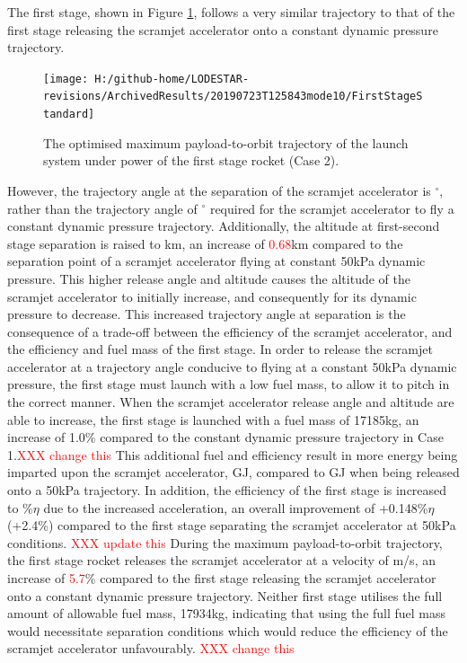 The first stage, shown in Figure \ref{fig:FirstStageStandardNoReturn}, follows a very similar trajectory to that of the first stage releasing the scramjet accelerator onto a constant dynamic pressure trajectory.
\begin{figure}[ht!]%
	\centering
	\texttt{[image: H:/github-home/LODESTAR-revisions/ArchivedResults/20190723T125843mode10/FirstStageStandard]}
	\caption{The optimised maximum payload-to-orbit trajectory of the launch system under power of the first stage rocket (Case 2).}
	\label{fig:FirstStageStandardNoReturn}
\end{figure}
 However, the trajectory angle at the separation of the scramjet accelerator is \secondthirdSeparationgammaqStandardNoReturn$^\circ$, rather than the trajectory angle of \secondthirdSeparationgammaConstqNoReturn$^\circ$ required for the scramjet accelerator to fly a constant dynamic pressure trajectory. Additionally, the altitude at first-second stage separation is raised to \firstsecondSeparationAltStandardNoReturn km, an increase of \textcolor{red}{0.68}km compared to the separation point of a scramjet accelerator flying at constant 50kPa dynamic pressure. This higher release angle and altitude causes the altitude of the scramjet accelerator to initially increase, and consequently for its dynamic pressure to decrease. This increased trajectory angle at separation is the consequence of a trade-off between the efficiency of the scramjet accelerator, and the efficiency and fuel mass of the first stage. 
 In order to release the scramjet accelerator at a trajectory angle conducive to flying at a constant 50kPa dynamic pressure, the first stage must launch with a low fuel mass, to allow it to pitch in the correct manner. When the scramjet accelerator release angle and altitude are able to increase, the first stage is launched with a fuel mass of 17185kg, an increase of 1.0\% compared to the constant dynamic pressure trajectory in Case 1.\textcolor{red}{XXX change this} This additional fuel and efficiency result in more energy being imparted upon the scramjet accelerator, \firstdExergyStandardNoReturn GJ, compared to \firstdExergyConstqNoReturn GJ when being released onto a 50kPa trajectory. 
 In addition, the efficiency of the first stage is increased to \firstExergyEffStandardNoReturn\%$\eta$ due to the increased acceleration, an overall improvement of +0.148\%$\eta$ (+2.4\%) compared to the first stage separating the scramjet accelerator at 50kPa conditions. \textcolor{red}{XXX update this}
 During the maximum payload-to-orbit trajectory, the first stage rocket releases the scramjet accelerator at a velocity of \firstsecondSeparationvStandardNoReturn m/s, an increase of \textcolor{red}{5.7}\% compared to the first stage releasing the scramjet accelerator onto a constant dynamic pressure trajectory. Neither first stage utilises the full amount of allowable fuel mass, 17934kg, indicating that using the full fuel mass would necessitate separation conditions which would reduce the efficiency of the scramjet accelerator unfavourably. \textcolor{red}{XXX change this}
